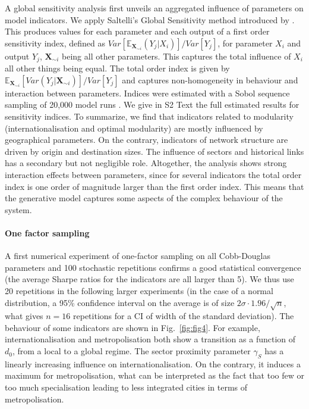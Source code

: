 \documentclass[10pt,letterpaper]{article}
\begin{document}
A global sensitivity analysis first unveils an aggregated influence of parameters on model indicators. We apply Saltelli's Global Sensitivity method introduced by \cite{saltelli2008global}. This produces values for each parameter and each output of a first order sensitivity index, defined as $Var\left[\mathbb{E}_{\mathbf{X}_{\sim i}}\left(Y_j | X_i\right)\right] / Var\left[Y_j\right]$, for parameter $X_i$ and output $Y_j$, $\mathbf{X}_{\sim i}$ being all other parameters. This captures the total influence of $X_i$ all other things being equal. The total order index is given by $\mathbb{E}_{\mathbf{X}_{\sim i}} \left[Var(Y_j | \mathbf{X}_{\sim i})\right] / Var\left[Y_j\right]$ and captures non-homogeneity in behaviour and interaction between parameters. Indices were estimated with a Sobol sequence sampling of 20,000 model runs \cite{saltelli2010variance}. We give in S2 Text the full estimated results for sensitivity indices. To summarize, we find that indicators related to modularity (internationalisation and optimal modularity) are mostly influenced by geographical parameters. On the contrary, indicators of network structure are driven by origin and destination sizes. The influence of sectors and historical links has a secondary but not negligible role. Altogether, the analysis shows strong interaction effects between parameters, since for several indicators the total order index is one order of magnitude larger than the first order index. This means that the generative model captures some aspects of the complex behaviour of the system.



\paragraph{One factor sampling}

A first numerical experiment of one-factor sampling on all Cobb-Douglas parameters and 100 stochastic repetitions confirms a good statistical convergence (the average Sharpe ratios for the indicators are all larger than 5). We thus use 20 repetitions in the following larger experiments (in the case of a normal distribution, a 95\% confidence interval on the average is of size $2\sigma \cdot 1.96 / \sqrt{n}$, what gives $n=16$ repetitions for a CI of width of the standard deviation). The behaviour of some indicators are shown in Fig.~\ref{fig:fig4}. For example, internationalisation and metropolisation both show a transition as a function of $d_0$, from a local to a global regime. The sector proximity parameter $\gamma_S$ has a linearly increasing influence on internationalisation. On the contrary, it induces a maximum for metropolisation, what can be interpreted as the fact that too few or too much specialisation leading to less integrated cities in terms of metropolisation.
\end{document}
